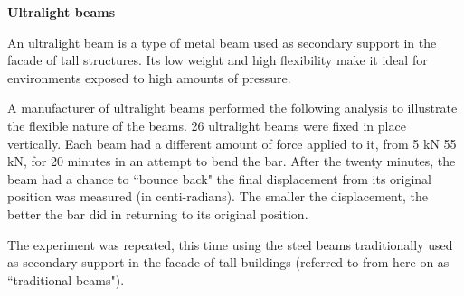\documentclass[addpoints]{examsetup}\usepackage[]{graphicx}\usepackage[]{color}
\newenvironment{knitrout}{}{} %
\begin{document}
\begin{questions}
\pagebreak

\question

\textbf{Ultralight beams}

An ultralight beam is a type of metal beam used as secondary support in the facade of tall structures. 
Its low weight and high flexibility make it ideal for environments exposed to high amounts of pressure.

A manufacturer of ultralight beams performed the following analysis to illustrate the flexible nature of the beams.
26 ultralight beams were fixed in place vertically.
Each beam had a different amount of force applied to it, from 5 kN 55 kN, for 20 minutes in an attempt to bend the bar.
After the twenty minutes, the beam had a chance to ``bounce back" the final displacement from its original position was measured (in centi-radians).
The smaller the displacement, the better the bar did in returning to its original position.

The experiment was repeated, this time using the steel beams traditionally used as secondary support in the facade of tall buildings (referred to from here on as ``traditional beams").


\end{questions}
\end{document}
